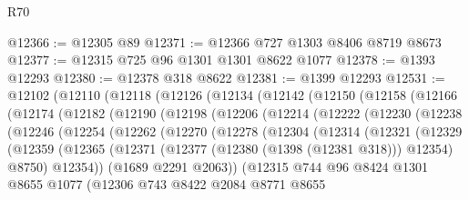 \begin{lexlean}{R70}
\begin{coremodule}
@12366 := @12305 @89
@12371 := @12366 @727 @1303 @8406 @8719 @8673
@12377 := @12315 @725 @96 @1301 @1301 @8622 @1077
@12378 := @1393 @12293
@12380 := @12378 @318 @8622
@12381 := @1399 @12293
@12531 := @12102
    (@12110
      (@12118
        (@12126
          (@12134
            (@12142
              (@12150
                (@12158
                  (@12166
                    (@12174
                      (@12182
                        (@12190
                          (@12198
                            (@12206
                              (@12214
                                (@12222
                                  (@12230
                                    (@12238
                                      (@12246
                                        (@12254
                                          (@12262
                                            (@12270
                                              (@12278
                                                (@12304
                                                  (@12314
                                                    (@12321
                                                      (@12329
                                                        (@12359
                                                          (@12365
                                                            (@12371
                                                              (@12377
                                                                (@12380 (@1398 (@12381 @318)))
                                                                @12354)
                                                              @8750)
                                                            @12354))
                                                        (@1689 @2291 @2063))
                                                      (@12315
                                                        @744
                                                        @96
                                                        @8424
                                                        @1301
                                                        @8655
                                                        @1077
                                                        (@12306
                                                          @743
                                                          @8422
                                                          @2084
                                                          @8771
                                                          @8655

\end{coremodule}
\end{lexlean}
